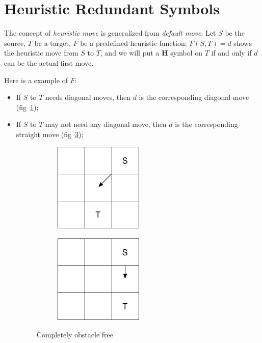 \section{Heuristic Redundant Symbols}
\label{sec:hmoves}

The concept of \textit{heuristic move} is generalized from \textit{default move}.
Let $S$ be the source, $T$ be a target, $F$ be a predefined heuristic function;
$F(S, T)=d$ shows the heuristic move from $S$ to $T$,
and we will put a \textbf{H} symbol on $T$ if and only if $d$ can be the actual first move. 

Here is a example of $F$:
\begin{itemize}
  \item If $S$ to $T$ needs diagonal moves, then $d$ is the corresponding diagonal move (fig~\ref{hmove1_1});

  \item If $S$ to $T$ may not need any diagonal move, then $d$ is the corresponding straight move (fig~\ref{hmove1_2});

    \begin{figure}[h]
      \centering
      \begin{subfigure}{.35\columnwidth}
      \centering
      \includegraphics[width=.6\columnwidth]{./hmove1.png}
        \caption{}
        \label{hmove1_1}
      \end{subfigure}%
      \begin{subfigure}{.35\columnwidth}
      \includegraphics[width=.6\columnwidth]{./hmove1_2.png}
      \centering
        \caption{}
        \label{hmove1_2}
      \end{subfigure}
      \caption{\small Completely obstacle free}
    \end{figure}


\end{itemize}
